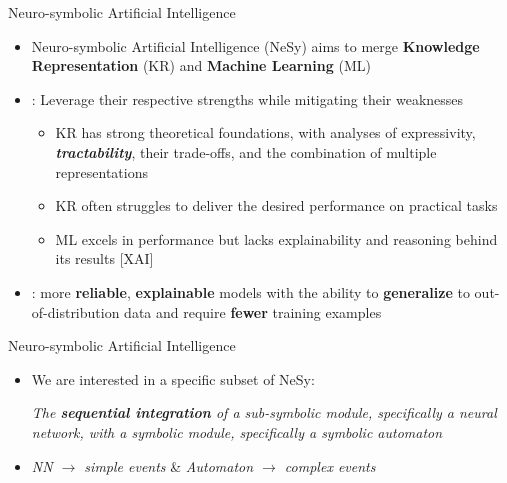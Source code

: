 \documentclass[10pt, aspectratio=169]{beamer}
\begin{document}
\begin{frame}{Neuro-symbolic Artificial Intelligence}
    \begin{itemize}
        \setlength{\itemsep}{13pt}
        \item Neuro-symbolic Artificial Intelligence (NeSy) aims to merge \textbf{Knowledge Representation} (KR) and \textbf{Machine Learning} (ML)
        \item {}: Leverage their respective strengths while mitigating their weaknesses
        \vspace{0.6em}
        \begin{itemize}
            \setlength{\itemsep}{4pt}
                \item KR has \textcolor{green!70!black}{strong theoretical foundations}, with analyses of expressivity, \textbf{\textit{tractability}}, their trade-offs, and the combination of multiple representations
                \item KR often struggles to deliver the desired  \textcolor{red!90!black}{performance} on practical tasks
                \item ML excels in \textcolor{green!70!black}{performance} but lacks \textcolor{red!90!black}{explainability} and reasoning behind its results [XAI]
            \end{itemize}
        \item {}: more \textbf{reliable}, \textbf{explainable} models with the ability to \textbf{generalize} to out-of-distribution data and require \textbf{fewer} training examples
    \end{itemize}
\end{frame}

\begin{frame}{Neuro-symbolic Artificial Intelligence}
    \begin{itemize}
        \setlength{\itemsep}{12pt}
        \item We are interested in a specific subset of NeSy:
        \vspace{1em}
        \begin{center}
            \textit{The \textbf{sequential integration} of a sub-symbolic module, specifically a neural network, with a symbolic module, specifically a symbolic automaton}
        \end{center}
        \item {} \textit{NN $\rightarrow$ simple events} \&  \textit{Automaton $\rightarrow$ complex events}
    \end{itemize}
\end{frame}
\end{document}
